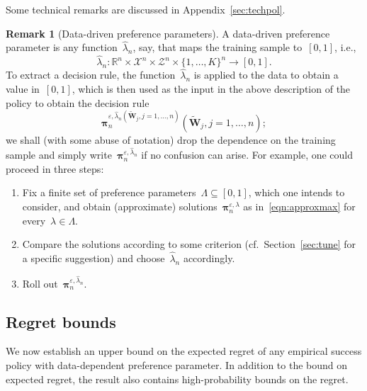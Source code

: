 \documentclass[11pt, a4paper]{article}
\newcommand{\R}{\mathbb{R}}
\theoremstyle{definition}
\newtheorem{remark}{Remark}[section]
\begin{document}
Some technical remarks are discussed in Appendix~\ref{sec:techpol}.

\begin{remark}[Data-driven preference parameters]\label{rem:ddtune}
A data-driven preference parameter is any function~$\hat{\lambda}_n$, say, that maps the training sample to~$[0, 1]$, i.e.,~$$\hat{\lambda}_n: \R^n \times \mathcal{X}^n \times \mathcal{Z}^n \times \{1, \hdots, K\}^n \to [0, 1].$$ To extract a decision rule, the function~$\hat{\lambda}_n$ is applied to the data to obtain a value in~$[0, 1]$, which is then used as the input in the above description of the policy to obtain the decision rule~$$\bm{\pi}_n^{\varepsilon, \hat{\lambda}_n(\tilde{\bm{W}}_j, j = 1, \hdots, n)}(\tilde{\bm{W}}_j, j = 1, \hdots, n);$$ we shall (with some abuse of notation) drop the dependence on the training sample and simply write~$\bm{\pi}_n^{\varepsilon, \hat{\lambda}_n}$ if no confusion can arise. For example, one could proceed in three steps:
\begin{enumerate}
\item Fix a finite set of preference parameters~$\Lambda \subseteq [0, 1]$, which one intends to consider, and obtain (approximate) solutions~$\bm{\pi}_n^{\varepsilon, \lambda}$ as in~\eqref{eqn:approxmax} for every~$\lambda \in \Lambda$.
\item Compare the solutions according to some criterion (cf.~Section~\ref{sec:tune} for a specific suggestion) and choose~$\hat{\lambda}_n$ accordingly.
\item Roll out~$\bm{\pi}_n^{\varepsilon, \hat{\lambda}_n}$.
\end{enumerate}
\end{remark}



\subsection{Regret bounds}

We now establish an upper bound on the expected regret of any empirical success policy with data-dependent preference parameter. In addition to the bound on expected regret, the result also contains high-probability bounds on the regret.
\end{document}
